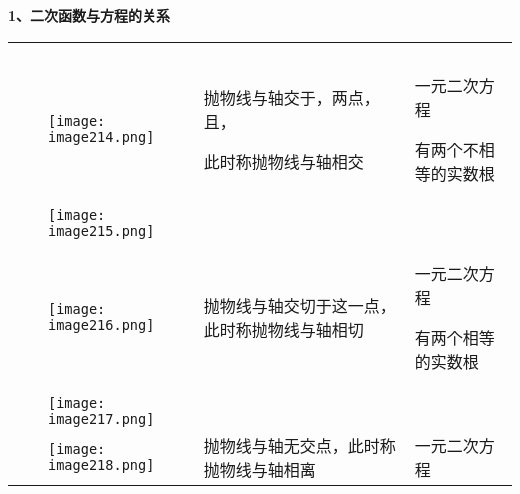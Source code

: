 \textbf{1、二次函数与方程的关系}

\begin{longtable}[]{@{}lllll@{}}
\toprule
\endhead
& & & &\tabularnewline
& & & &\tabularnewline
\begin{minipage}[t]{0.17\columnwidth}\raggedright
\strut
\end{minipage} & \begin{minipage}[t]{0.17\columnwidth}\raggedright
\strut
\end{minipage} & \begin{minipage}[t]{0.17\columnwidth}\raggedright
\texttt{[image: image214.png]}\strut
\end{minipage} & \begin{minipage}[t]{0.17\columnwidth}\raggedright
抛物线与轴交于，两点，且，

此时称抛物线与轴相交\strut
\end{minipage} & \begin{minipage}[t]{0.17\columnwidth}\raggedright
一元二次方程

有两个不相等的实数根\strut
\end{minipage}\tabularnewline
& &
\texttt{[image: image215.png]}
& &\tabularnewline
\begin{minipage}[t]{0.17\columnwidth}\raggedright
\strut
\end{minipage} & \begin{minipage}[t]{0.17\columnwidth}\raggedright
\strut
\end{minipage} & \begin{minipage}[t]{0.17\columnwidth}\raggedright
\texttt{[image: image216.png]}\strut
\end{minipage} & \begin{minipage}[t]{0.17\columnwidth}\raggedright
抛物线与轴交切于这一点，此时称抛物线与轴相切\strut
\end{minipage} & \begin{minipage}[t]{0.17\columnwidth}\raggedright
一元二次方程

有两个相等的实数根\strut
\end{minipage}\tabularnewline
& &
\texttt{[image: image217.png]}
& &\tabularnewline
\begin{minipage}[t]{0.17\columnwidth}\raggedright
\strut
\end{minipage} & \begin{minipage}[t]{0.17\columnwidth}\raggedright
\strut
\end{minipage} & \begin{minipage}[t]{0.17\columnwidth}\raggedright
\texttt{[image: image218.png]}\strut
\end{minipage} & \begin{minipage}[t]{0.17\columnwidth}\raggedright
抛物线与轴无交点，此时称抛物线与轴相离\strut
\end{minipage} & \begin{minipage}[t]{0.17\columnwidth}\raggedright
一元二次方程


\end{minipage}
\end{longtable}
